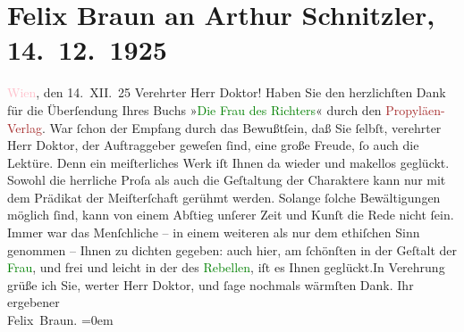 

               \section[Felix Braun an Arthur Schnitzler, 14. 12. 1925]{ Felix Braun an Arthur Schnitzler, 14. 12. 1925}\nopagebreak{}\rehead{ }\normalsize\beginnumbering{} \toendnotes[C]{\smallbreak\pagebreak[2]} 
\toendnotes[C]{\smallbreak}\pstart
           \centering{}{\pb}\textcolor{pink}{Wien}{}\ledrightnote{\textcolor{pink}{Wien}}, den 14. XII. 25\pend
           \pstart{}Verehrter Herr Doktor!\pend\pstart
           Haben Sie den herzlichſten Dank für die Überſendung Ihres Buchs »\textcolor{green}{Die Frau des Richters}{}\ledrightnote{\textcolor{green}{Die Frau des Richters. Novelle}}« durch den \textcolor{brown}{Propyläen-Verlag}{}\ledrightnote{\textcolor{brown}{Propyläen Verlag}}. War ſchon der Empfang durch das
                    Bewußtſein, daß Sie ſelbſt, verehrter Herr Doktor, der Auftraggeber geweſen
                    ſind, eine große Freude, ſo auch die Lektüre. Denn ein meiſterliches Werk iſt
                    Ihnen da wieder und makellos geglückt. Sowohl die herrliche Proſa als auch die
                    Geſtaltung der Charaktere kann nur mit dem Prädikat der Meiſter{\pb}ſchaft gerühmt werden. Solange ſolche Bewältigungen möglich ſind, kann von
                    einem Abſtieg unſerer Zeit und Kunſt die Rede nicht ſein.\pend
           \pstart
           Immer war das Menſchliche – in einem weiteren als nur dem ethiſchen Sinn genommen
                    – Ihnen zu dichten gegeben: auch hier, am ſchönſten in der Geſtalt der \textcolor{green}{Frau}{}, und frei und leicht in
                    der des \textcolor{green}{Rebellen}{}, iſt es
                    Ihnen geglückt.\hspace*{1.5em}In Verehrung grüße ich Sie,
                    werter Herr Doktor, und ſage nochmals wärmſten Dank.\pend
           \pstart
           Ihr ergebener{\\[\baselineskip]}\spacefill\mbox{Felix Braun.}\pend
           \leftskip=0em{}\endnumbering{}  
      